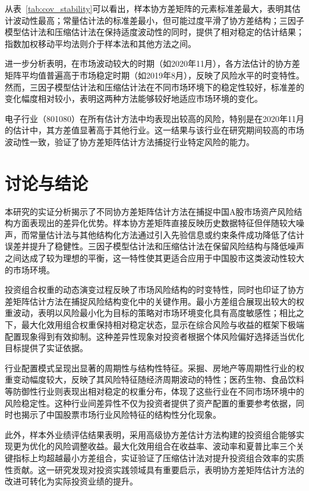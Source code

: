 \documentclass[12pt, a4paper]{article}
\begin{document}
从表~\ref{tab:cov_stability}可以看出，样本协方差矩阵的元素标准差最大，表明其估计波动性最高；常量估计法的标准差最小，但可能过度平滑了协方差结构；三因子模型估计法和压缩估计法在保持适度波动性的同时，提供了相对稳定的估计结果；指数加权移动平均法则介于样本法和其他方法之间。

进一步分析表明，在市场波动较大的时期（如2020年11月），各方法估计的协方差矩阵平均值普遍高于市场稳定时期（如2019年8月），反映了风险水平的时变特性。然而，三因子模型估计法和压缩估计法在不同市场环境下的稳定性较好，标准差的变化幅度相对较小，表明这两种方法能够较好地适应市场环境的变化。

电子行业（801080）在所有估计方法中均表现出较高的风险，特别是在2020年11月的估计中，其方差值显著高于其他行业。这一结果与该行业在研究期间较高的市场波动性一致，验证了协方差矩阵估计方法捕捉行业特定风险的能力。

\section{讨论与结论}

本研究的实证分析揭示了不同协方差矩阵估计方法在捕捉中国A股市场资产风险结构方面表现出的差异化优势。样本协方差矩阵直接反映历史数据特征但伴随较大噪声，而常量估计法与其他结构化方法通过引入先验信息或约束条件成功降低了估计误差并提升了稳健性。三因子模型估计法和压缩估计法在保留风险结构与降低噪声之间达成了较为理想的平衡，这一特性使其更适合应用于中国股市这类波动性较大的市场环境。

投资组合权重的动态演变过程反映了市场风险结构的时变特性，同时也印证了协方差矩阵估计方法在捕捉风险结构变化中的关键作用。最小方差组合展现出较大的权重波动，表明以风险最小化为目标的策略对市场环境变化具有高度敏感性；相比之下，最大化效用组合权重保持相对稳定状态，显示在综合风险与收益的框架下极端配置现象得到有效抑制。这种差异性现象对投资者根据个体风险偏好选择适当优化目标提供了实证依据。

行业配置模式呈现出显著的周期性与结构性特征。采掘、房地产等周期性行业的权重变动幅度较大，反映了其风险特征随经济周期波动的特性；医药生物、食品饮料等防御性行业则表现出相对稳定的权重分布，体现了这些行业在不同市场环境中的风险稳定性。这种行业间差异性不仅为投资者提供了资产配置的重要参考依据，同时也揭示了中国股票市场行业风险特征的结构性分化现象。

此外，样本外业绩评估结果表明，采用高级协方差估计方法构建的投资组合能够实现更为优化的风险调整收益。最大化效用组合在收益率、波动率和夏普比率三个关键指标上均超越最小方差组合，实证验证了压缩估计法对提升投资组合效率的实质性贡献。这一研究发现对投资实践领域具有重要启示，表明协方差矩阵估计方法的改进可转化为实际投资业绩的提升。
\end{document}
